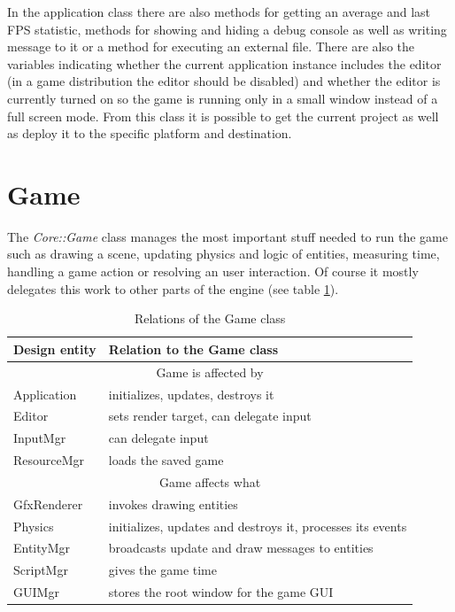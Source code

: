 \documentclass[a4paper, 12pt]{report}
\begin{document}
In the application class there are also methods for getting an average and last FPS statistic, methods for showing and hiding a debug console as well as writing message to it or a method for executing an external file. There are also the variables indicating whether the current application instance includes the editor (in a game distribution the editor should be disabled) and whether the editor is currently turned on so the game is running only in a small window instead of a full screen mode. From this class it is possible to get the current project as well as deploy it to the specific platform and destination.

\section{Game}

The \emph{Core::Game} class manages the most important stuff needed to run the game such as drawing a scene, updating physics and logic of entities, measuring time, handling a game action or resolving an user interaction. Of course it mostly delegates this work to other parts of the engine (see table \ref{tab:game-relation}).

\begin{table}[htbp]
	\centering
		\begin{tabular}{|p{0.18\hsize}|p{0.75\hsize}|}
			\hline
			Design entity & Relation to the Game class\\
			\hline
			\multicolumn{2}{|c|}{Game is affected by}\\
			\hline
			Application & initializes, updates, destroys it\\
			Editor & sets render target, can delegate input\\
			InputMgr & can delegate input\\
			ResourceMgr & loads the saved game\\
			\hline
			\multicolumn{2}{|c|}{Game affects what}\\
			\hline
			GfxRenderer & invokes drawing entities\\
			Physics & initializes, updates and destroys it, processes its events\\
			EntityMgr & broadcasts update and draw messages to entities\\
			ScriptMgr & gives the game time\\
			GUIMgr & stores the root window for the game GUI\\
			\hline
		\end{tabular}
	\caption[Relations of the Game class]{Relations of the Game class}
	\label{tab:game-relation}
\end{table}
\end{document}
